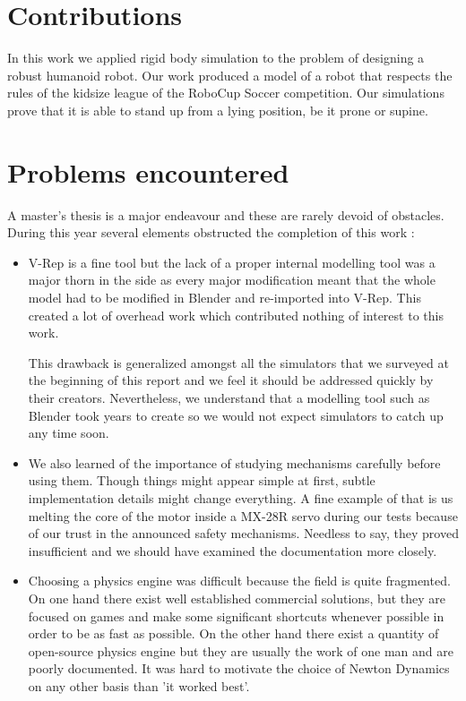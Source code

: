\section{Contributions}
In this work we applied rigid body simulation to the problem of designing a robust humanoid robot. Our work produced a model of a robot that respects the rules of the kidsize league of the RoboCup Soccer competition. Our simulations prove that it is able to stand up from a lying position, be it prone or supine. 

\section{Problems encountered}
A master's thesis is a major endeavour and these are rarely devoid of obstacles. During this year several elements obstructed the completion of this work : \begin{itemize}
\item V-Rep is a fine tool but the lack of a proper internal modelling tool was a major thorn in the side as every major modification meant that the whole model had to be modified in Blender and re-imported into V-Rep. This created a lot of overhead work which contributed nothing of interest to this work. 

This drawback is generalized amongst all the simulators that we surveyed at the beginning of this report and we feel it should be addressed quickly by their creators. Nevertheless, we understand that a modelling tool such as Blender took years to create so we would not expect simulators to catch up any time soon.

\item We also learned of the importance of studying mechanisms carefully before using them. Though things might appear simple at first, subtle implementation details might change everything. A fine example of that is us melting the core of the motor inside a MX-28R servo during our tests because of our trust in the announced safety mechanisms. Needless to say, they proved insufficient and we should have examined the documentation more closely.

\item Choosing a physics engine was difficult because the field is quite fragmented. On one hand there exist well established commercial solutions, but they are focused on games and make some significant shortcuts whenever possible in order to be as fast as possible. On the other hand there exist a quantity of open-source physics engine but they are usually the work of one man and are poorly documented. It was hard to motivate the choice of Newton Dynamics on any other basis than 'it worked best'.
\end{itemize}

